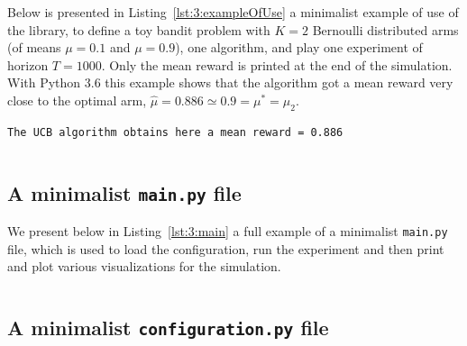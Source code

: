 Below is presented in Listing~\ref{lst:3:exampleOfUse} a minimalist example of use of the library, to define a toy bandit problem with $K=2$ Bernoulli distributed arms (of means $\mu=0.1$ and $\mu=0.9$), one \UCB{} algorithm, and play one experiment of horizon $T=1000$.
Only the mean reward is printed at the end of the simulation.
%
With Python 3.6 this example shows that the algorithm got a mean reward very close to the optimal arm, $\hat{\mu} = 0.886 \simeq 0.9 = \mu^* = \mu_2$.
\begin{verbatim}
The UCB algorithm obtains here a mean reward = 0.886
\end{verbatim}
%
\begin{small}
    \inputminted[linenos=true,numbersep=5pt,frame=lines,framesep=2mm]{python3}{2-Chapters/3-Chapter/src/example_of_use_of_SMPyBandits.py}
\end{small}


\subsection{A minimalist \texttt{main.py} file}

We present below in Listing~\ref{lst:3:main} a full example of a minimalist \texttt{main.py} file,
which is used to load the configuration, run the experiment and then print and plot various visualizations for the simulation.

\begin{small}
    \inputminted[linenos=true,numbersep=5pt,frame=lines,framesep=2mm]{python3}{2-Chapters/3-Chapter/src/example_of_main_singleplayer.py}
\end{small}


\subsection{A minimalist \texttt{configuration.py} file}

